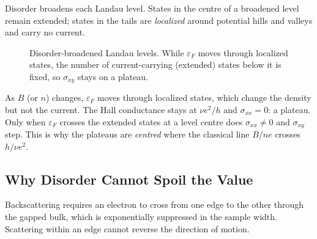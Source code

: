 Disorder broadens each Landau level. States in the centre of a broadened level remain extended; states in the tails are \emph{localized} around potential hills and valleys and carry no current.

\begin{figure}[ht]
\centering
{}
\caption{Disorder-broadened Landau levels. While $\varepsilon_F$ moves through localized states, the number of current-carrying (extended) states below it is fixed, so $\sigma_{xy}$ stays on a plateau.}
\label{fig:qhe-broadened}
\end{figure}

As $B$ (or $n$) changes, $\varepsilon_F$ moves through localized states, which change the density but not the current. The Hall conductance stays at $\nu e^2/h$ and $\sigma_{xx} = 0$: a plateau. Only when $\varepsilon_F$ crosses the extended states at a level centre does $\sigma_{xx}\neq0$ and $\sigma_{xy}$ step. This is why the plateaus are \emph{centred} where the classical line $B/ne$ crosses $h/\nu e^2$.

\subsection{Why Disorder Cannot Spoil the Value}

Backscattering requires an electron to cross from one edge to the other through the gapped bulk, which is exponentially suppressed in the sample width. Scattering within an edge cannot reverse the direction of motion.

